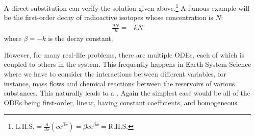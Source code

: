 A direct substitution can verify the solution given above.\footnote{$\text{L.H.S.} = \frac{d}{dx} (ce^{\beta x}) = \beta ce^{\beta x} = \text{R.H.S.}$} A famous example will be the first-order decay of radioactive isotopes whose concentration is $N$:
\begin{align*}
\frac{dN}{dt} = -kN
\end{align*}
where $\beta = -k$ is the decay constant.
\par
However, for many real-life problems, there are multiple ODEs, each of which is coupled to others in the system. This frequently happens in Earth System Science where we have to consider the interactions between different variables, for instance, mass flows and chemical reactions between the reservoirs of various substances. This naturally leads to a . Again the simplest case would be all of the ODEs being first-order, linear, having constant coefficients, and homogeneous.

